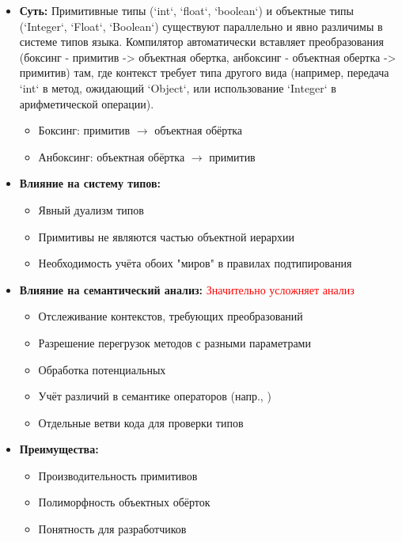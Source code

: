 \begin{itemize}
    \item \textbf{Суть:} Примитивные типы (`int`, `float`, `boolean`) и объектные типы (`Integer`, `Float`, `Boolean`) существуют параллельно и явно различимы в системе типов языка. Компилятор автоматически вставляет преобразования (боксинг - примитив -> объектная обертка, анбоксинг - объектная обертка -> примитив) там, где контекст требует типа другого вида (например, передача `int` в метод, ожидающий `Object`, или использование `Integer` в арифметической операции).
    \begin{itemize}
        \item Боксинг: примитив $\rightarrow$ объектная обёртка
        \item Анбоксинг: объектная обёртка $\rightarrow$ примитив
    \end{itemize}

    \item \textbf{Влияние на систему типов:}
    \begin{itemize}
        \item Явный дуализм типов
        \item Примитивы не являются частью объектной иерархии
        \item Необходимость учёта обоих "миров" в правилах подтипирования
    \end{itemize}

    \item \textbf{Влияние на семантический анализ:} \textcolor{red}{Значительно усложняет анализ}
    \begin{itemize}
        \item Отслеживание контекстов, требующих преобразований
        \item Разрешение перегрузок методов с разными параметрами
        \item Обработка потенциальных 
        \item Учёт различий в семантике операторов (напр., \code{==})
        \item Отдельные ветви кода для проверки типов
    \end{itemize}

    \item \textbf{Преимущества:}
    \begin{itemize}
        \item Производительность примитивов
        \item Полиморфность объектных обёрток
        \item Понятность для разработчиков
    \end{itemize}


\end{itemize}
